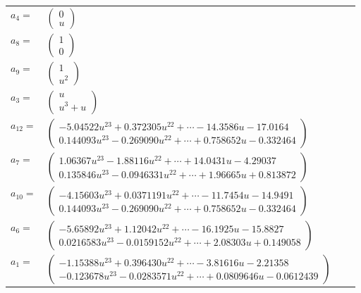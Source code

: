 \documentclass[1p]{elsarticle_modified}
\theoremstyle{definition}
\begin{document}
\begin{tabular}{m{7pt} m{180pt} m{7pt} m{180pt} }
\flushright $a_{4}=$&$\begin{pmatrix}0\\u\end{pmatrix}$ \\
\flushright $a_{8}=$&$\begin{pmatrix}1\\0\end{pmatrix}$ \\
\flushright $a_{9}=$&$\begin{pmatrix}1\\u^2\end{pmatrix}$ \\
\flushright $a_{3}=$&$\begin{pmatrix}u\\u^3+u\end{pmatrix}$ \\
\flushright $a_{12}=$&$\begin{pmatrix}-5.04522 u^{23}+0.372305 u^{22}+\cdots-14.3586 u-17.0164\\0.144093 u^{23}-0.269090 u^{22}+\cdots+0.758652 u-0.332464\end{pmatrix}$ \\
\flushright $a_{7}=$&$\begin{pmatrix}1.06367 u^{23}-1.88116 u^{22}+\cdots+14.0431 u-4.29037\\0.135846 u^{23}-0.0946331 u^{22}+\cdots+1.96665 u+0.813872\end{pmatrix}$ \\
\flushright $a_{10}=$&$\begin{pmatrix}-4.15603 u^{23}+0.0371191 u^{22}+\cdots-11.7454 u-14.9491\\0.144093 u^{23}-0.269090 u^{22}+\cdots+0.758652 u-0.332464\end{pmatrix}$ \\
\flushright $a_{6}=$&$\begin{pmatrix}-5.65892 u^{23}+1.12042 u^{22}+\cdots-16.1925 u-15.8827\\0.0216583 u^{23}-0.0159152 u^{22}+\cdots+2.08303 u+0.149058\end{pmatrix}$ \\
\flushright $a_{1}=$&$\begin{pmatrix}-1.15388 u^{23}+0.396430 u^{22}+\cdots-3.81616 u-2.21358\\-0.123678 u^{23}-0.0283571 u^{22}+\cdots+0.0809646 u-0.0612439\end{pmatrix}$ \\

\end{tabular}
\end{document}
